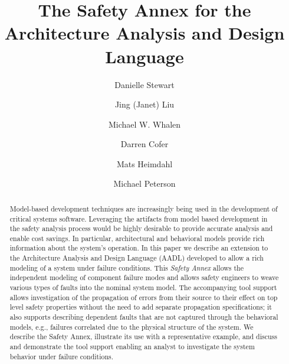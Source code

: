 \documentclass{llncs}
\begin{document}
\newcommand{\stateequiv}{\equiv_{s}}
\newcommand{\traceequiv}{\equiv_{\sigma}}
\newcommand{\ta}{\text{TA}}
\newcommand{\cta}{\text{TA$_{C}$}}
\newcommand{\tta}{\text{TA$_{T}$}}
\newcommand{\ucalg}{\texttt{\small{IVC\_UC}}}
\newcommand{\ucbfalg}{\texttt{\small{IVC\_UCBF}}}


\title{The Safety Annex for the Architecture Analysis and Design Language}
%
\author{Danielle Stewart
\and Jing (Janet) Liu
\and Michael W. Whalen
\and Darren Cofer
\and Mats Heimdahl
\and Michael Peterson}
\maketitle

\begin{abstract}
Model-based development techniques are increasingly being used in the development of critical systems software. Leveraging the artifacts from model based development in the safety analysis process would be highly desirable to provide accurate analysis and enable cost savings. In particular, architectural and behavioral models provide rich information about the system's operation. In this paper we describe an extension 
to the Architecture Analysis and Design Language (AADL) developed to allow a rich modeling of a system under failure conditions. This \emph{Safety Annex} allows the independent modeling of component failure modes and allows safety engineers to weave various types of faults into the nominal system model. 
The accompanying tool support allows investigation of the propagation of errors from their source to their effect on top level safety properties without the need to add separate propagation specifications; 
it  also supports describing dependent faults that are not captured through the behavioral models, 
e.g., failures correlated due to the physical structure of the system.
We describe the Safety Annex, illustrate its use with a representative example, and discuss and demonstrate the tool support enabling an analyst to investigate the system behavior under failure conditions.	
	

\end{abstract}
\end{document}
